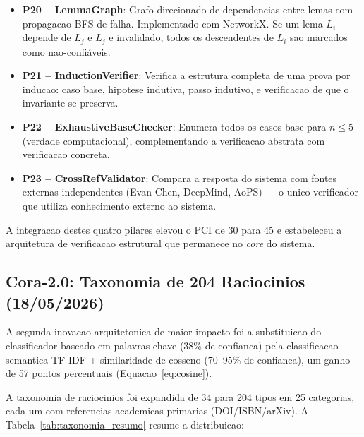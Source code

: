 \documentclass[5p]{elsarticle}
\begin{document}
\begin{itemize}[leftmargin=*]
  \item \textbf{P20 -- LemmaGraph}: Grafo direcionado de dependencias entre lemas
        com propagacao BFS de falha. Implementado com NetworkX. Se um lema $L_i$
        depende de $L_j$ e $L_j$ e invalidado, todos os descendentes de $L_i$ sao
        marcados como nao-confiáveis.
  \item \textbf{P21 -- InductionVerifier}: Verifica a estrutura completa de uma
        prova por inducao: caso base, hipotese indutiva, passo indutivo, e
        verificacao de que o invariante se preserva.
  \item \textbf{P22 -- ExhaustiveBaseChecker}: Enumera todos os casos base para
        $n \leq 5$ (verdade computacional), complementando a verificacao abstrata
        com verificacao concreta.
  \item \textbf{P23 -- CrossRefValidator}: Compara a resposta do sistema com
        fontes externas independentes (Evan Chen, DeepMind, AoPS) --- o unico
        verificador que utiliza conhecimento externo ao sistema.
\end{itemize}

A integracao destes quatro pilares elevou o PCI de 30 para 45 e estabeleceu a
arquitetura de verificacao estrutural que permanece no \textit{core} do sistema.

\subsection{Cora-2.0: Taxonomia de 204 Raciocinios (18/05/2026)}

A segunda inovacao arquitetonica de maior impacto foi a substituicao do
classificador baseado em palavras-chave (38\% de confianca) pela classificacao
semantica TF-IDF + similaridade de cosseno (70--95\% de confianca), um ganho de
57 pontos percentuais (Equacao~\ref{eq:cosine}).

A taxonomia de raciocinios foi expandida de 34 para 204 tipos em 25 categorias,
cada um com referencias academicas primarias (DOI/ISBN/arXiv). A Tabela~\ref{tab:taxonomia_resumo}
resume a distribuicao:
\end{document}
